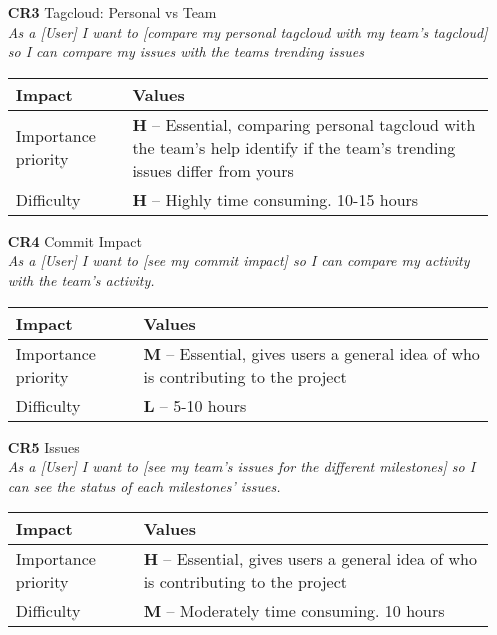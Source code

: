 \begin{itemize}
    \item[\textbf{CR3}] Tagcloud: Personal vs Team\\
        \textit{\small{As a [User] I want to [compare my personal tagcloud with my team's tagcloud] so I can compare my issues with the teams trending issues}}

        \begin{tabular}{| l | p{8cm} |}
            \hline
            \rowcolor[gray]{0.8}
            \textbf{Impact} & \textbf{Values} \\
            \hline
            Importance priority & \textbf{H} -- Essential, comparing personal tagcloud with the team's help identify if the team's trending issues differ from yours\\
            Difficulty & \textbf{H} -- Highly time consuming. 10-15 hours\\
            \hline
        \end{tabular}
    \vspace{0.5cm}

    \item[\textbf{CR4}] Commit Impact\\
        \textit{\small{As a [User] I want to [see my commit impact] so I can compare my activity with the team's activity.}}

        \begin{tabular}{| l | p{8cm} |}
            \hline
            \rowcolor[gray]{0.8}
            \textbf{Impact} & \textbf{Values} \\
            \hline
            Importance priority & \textbf{M} -- Essential, gives users a general idea of who is contributing to the project\\
            Difficulty & \textbf{L} -- 5-10 hours\\
            \hline
        \end{tabular}
    \vspace{0.5cm}

    \item[\textbf{CR5}] Issues\\
        \textit{\small{As a [User] I want to [see my team's issues for the different milestones] so I can see the status of each milestones' issues.}}

        \begin{tabular}{| l | p{8cm} |}
            \hline
            \rowcolor[gray]{0.8}
            \textbf{Impact} & \textbf{Values} \\
            \hline
            Importance priority & \textbf{H} -- Essential, gives users a general idea of who is contributing to the project\\
            Difficulty & \textbf{M} -- Moderately time consuming. 10 hours\\
            \hline
        \end{tabular}
    \vspace{0.5cm}


\end{itemize}
